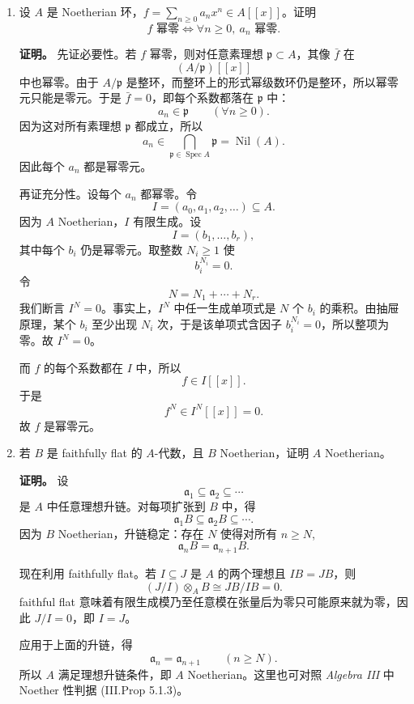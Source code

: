 \documentclass[a4paper]{ctexart}
\begin{document}
\begin{enumerate}[leftmargin=*, label=\textbf{7.\arabic*.}]
现在 \(\mathfrak a_0\) 有限生成，\((\mathfrak a:x)\) 有限生成，因此
\[
x(\mathfrak a:x)
\]
也有限生成。由
\[
\mathfrak a=\mathfrak a_0+x(\mathfrak a:x)
\]
可知 \(\mathfrak a\) 也是有限生成理想，这与 \(\mathfrak a\in\mathcal E\) 矛盾。

故 \(\mathfrak a\) 必为素理想。

于是得到 Cohen 定理：若一个环中每个素理想都有限生成，而环本身却不是 Noetherian，则 \(\mathcal E\) 有极大元，且该极大元是素理想；但它按定义又不是有限生成，矛盾。故这样的环一定是 Noetherian。

\item 设 \(A\) 是 Noetherian 环，\(f=\sum_{n\ge 0}a_nx^n\in A[[x]]\)。证明
\[
f \text{ 幂零}
\Longleftrightarrow
\forall n\ge 0,\ a_n \text{ 幂零}.
\]

\textbf{证明。}
先证必要性。若 \(f\) 幂零，则对任意素理想 \(\mathfrak p\subset A\)，其像 \(\bar f\) 在
\[
(A/\mathfrak p)[[x]]
\]
中也幂零。由于 \(A/\mathfrak p\) 是整环，而整环上的形式幂级数环仍是整环，所以幂零元只能是零元。于是 \(\bar f=0\)，即每个系数都落在 \(\mathfrak p\) 中：
\[
a_n\in \mathfrak p\qquad (\forall n\ge 0).
\]
因为这对所有素理想 \(\mathfrak p\) 都成立，所以
\[
a_n\in \bigcap_{\mathfrak p\in\operatorname{Spec}A}\mathfrak p=\operatorname{Nil}(A).
\]
因此每个 \(a_n\) 都是幂零元。

再证充分性。设每个 \(a_n\) 都幂零。令
\[
I=(a_0,a_1,a_2,\dots)\subseteq A.
\]
因为 \(A\) Noetherian，\(I\) 有限生成。设
\[
I=(b_1,\dots,b_r),
\]
其中每个 \(b_i\) 仍是幂零元。取整数 \(N_i\ge 1\) 使
\[
b_i^{N_i}=0.
\]
令
\[
N=N_1+\cdots+N_r.
\]
我们断言 \(I^N=0\)。事实上，\(I^N\) 中任一生成单项式是 \(N\) 个 \(b_i\) 的乘积。由抽屉原理，某个 \(b_i\) 至少出现 \(N_i\) 次，于是该单项式含因子 \(b_i^{N_i}=0\)，所以整项为零。故 \(I^N=0\)。

而 \(f\) 的每个系数都在 \(I\) 中，所以
\[
f\in I[[x]].
\]
于是
\[
f^N\in I^N[[x]]=0.
\]
故 \(f\) 是幂零元。

\setcounter{enumi}{11}
\item 若 \(B\) 是 faithfully flat 的 \(A\)-代数，且 \(B\) Noetherian，证明 \(A\) Noetherian。

\textbf{证明。}
设
\[
\mathfrak a_1\subseteq \mathfrak a_2\subseteq \cdots
\]
是 \(A\) 中任意理想升链。对每项扩张到 \(B\) 中，得
\[
\mathfrak a_1B\subseteq \mathfrak a_2B\subseteq \cdots.
\]
因为 \(B\) Noetherian，升链稳定：存在 \(N\) 使得对所有 \(n\ge N\),
\[
\mathfrak a_nB=\mathfrak a_{n+1}B.
\]

现在利用 faithfully flat。若 \(I\subseteq J\) 是 \(A\) 的两个理想且 \(IB=JB\)，则
\[
(J/I)\otimes_A B\cong JB/IB=0.
\]
faithful flat 意味着有限生成模乃至任意模在张量后为零只可能原来就为零，因此 \(J/I=0\)，即 \(I=J\)。

应用于上面的升链，得
\[
\mathfrak a_n=\mathfrak a_{n+1}\qquad (n\ge N).
\]
所以 \(A\) 满足理想升链条件，即 \(A\) Noetherian。这里也可对照 \textit{Algebra III} 中 Noether 性判据 (III.Prop 5.1.3)。
\end{enumerate}
\end{document}

